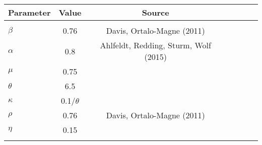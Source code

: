 \begin{tabular}{lcccccc} \hline
Parameter & Value & Source\\ \hline
 &  &  &    \\
 $\beta$ & 0.76 & Davis, Ortalo-Magne (2011) \\
 $\alpha$ & 0.8 & Ahlfeldt, Redding, Sturm, Wolf (2015) \\
 $\mu$ & 0.75 & \\
 $\theta$ & 6.5 & \\
 $\kappa$ & 0.1/$\theta$ & \\
 $\rho$ & 0.76 &  Davis, Ortalo-Magne (2011) \\
 $\eta$ & 0.15 & \\
 &  &  &    \\
 \hline

\end{tabular}
